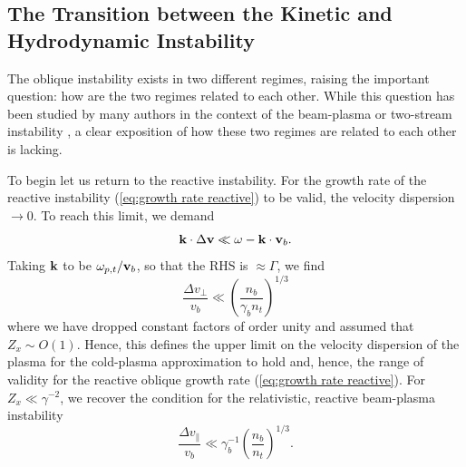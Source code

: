 \documentclass[usenatbib,iop,apj,numberedappendix]{aeb_emulateapj_2010}
\newcommand\bmath[1] {\mbox{\boldmath$\rm #1$}}
\newcommand{\vel}{\ensuremath{\bmath{v}}}
\newcommand{\kvec}{\ensuremath{\bmath{k}}}
\begin{document}
\subsection{The Transition between the Kinetic and Hydrodynamic Instability}\label{sec:transition}

The oblique instability exists in two different regimes, raising the important question: how are the two regimes related to each other. While this question has been studied by many authors in the context of the beam-plasma or two-stream instability \citep[see for instance][]{Melrose86,Boyd},  a clear exposition of how these two regimes are related to each other is lacking.  

To begin let us return to the reactive instability.  For the growth rate of the reactive instability (\ref{eq:growth rate reactive}) to be valid, the velocity dispersion $\rightarrow 0$.   To reach this limit, we demand
\begin{equation}
 \kvec\cdot\Delta \vel \ll \omega - \kvec\cdot\vel_b.
\end{equation}
Taking $\kvec$ to be $\omega_{p,t}/\vel_b$, so that the RHS is $\approx \Gamma$, we find
\begin{equation}\label{eq:oblique reactive regime}
 \frac{\Delta v_{\perp}}{v_b} \ll \left(\frac{n_b}{\gamma_b n_t}\right)^{1/3}
\end{equation}
where we have dropped constant factors of order unity and assumed that $Z_x \sim O(1)$.  Hence, this defines the upper limit on the velocity dispersion of the plasma for the cold-plasma approximation to hold and, hence, the range of validity for the reactive oblique growth rate (\ref{eq:growth rate reactive}).  For $Z_x \ll \gamma^{-2}$, we recover the condition for the relativistic, reactive beam-plasma instability \citep{Boyd}
\begin{equation}\label{eq:bp reactive regime}
\frac{\Delta v_{\parallel}}{v_b} \ll \gamma_b^{-1}\left(\frac{n_b}{n_t}\right)^{1/3}.
\end{equation}
\end{document}
